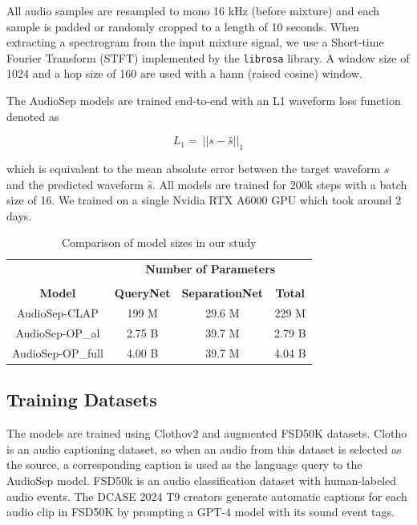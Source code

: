 \documentclass[11pt]{article}
\begin{document}
All audio samples are resampled to mono 16 kHz (before mixture) and each sample is padded or randomly cropped to a length of 10 seconds. When extracting a spectrogram from the input mixture signal, we use a Short-time Fourier Transform (STFT) implemented by the \verb|librosa| library. A window size of 1024 and a hop size of 160 are used with a hann (raised cosine) window.

The AudioSep models are trained end-to-end with an L1 waveform loss function denoted as

\begin{equation}
    L_1 = \ \left\vert\vert s - \hat{s} \vert\right\vert_1
\end{equation}

\noindent which is equivalent to the mean absolute error between the target waveform $s$ and the predicted waveform $\hat{s}$. All models are trained for 200k steps with a batch size of 16. We trained on a single Nvidia RTX A6000 GPU which took around 2 days.

\begin{table}[!htbp]
  \centering
  \begin{tabular}{cccc}
                               & \multicolumn{3}{c}{\textbf{Number of Parameters}} \\
    \cline{2-4}
    \vspace{0.25mm} \\  
    \textbf{Model}             & \textbf{QueryNet}  & \textbf{SeparationNet} & \textbf{Total} \\
    \hline
    AudioSep-CLAP              &  199 M             &  29.6 M                & 229 M          \\
    AudioSep-OP\_al     &  2.75 B            &  39.7 M                & 2.79 B         \\
    AudioSep-OP\_full   &  4.00  B           &  39.7 M                & 4.04 B         \\
    \hline
  \end{tabular}
  \caption{Comparison of model sizes in our study}
\end{table}

\subsection{Training Datasets}
The models are trained using Clothov2 \cite{clotho} and augmented FSD50K \cite{fsd50k} datasets. Clotho is an audio captioning dataset, so when an audio from this dataset is selected as the source, a corresponding caption is used as the language query to the AudioSep model. FSD50k is an audio classification dataset with human-labeled audio events. The DCASE 2024 T9 creators generate automatic captions for each audio clip in FSD50K by prompting a GPT-4 model with its sound event tags. 
\end{document}

